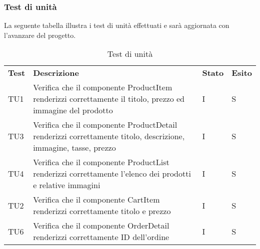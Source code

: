 \subsubsection{Test di unità}
La seguente tabella illustra i test di unità effettuati e sarà aggiornata con l'avanzare del progetto.
\begin{center}
    \centering
    \renewcommand{\arraystretch}{1.8}
    \label{tab:TestUnita}
    \begin{longtable}[!h]{p{45px} p{255px} p{35px} p{35px}}
        \caption{Test di unità}                                                                                                                                                                                                                            \\
        \rowcolor{logo!70}
        \textbf{Test} & \textbf{Descrizione}                                                                                                                                                                             & \textbf{Stato} & \textbf{Esito} \\
        TU1           & Verifica che il componente ProductItem renderizzi correttamente il titolo, prezzo ed immagine del prodotto                                                                                       & I              & S              \\
        TU3           & Verifica che il componente ProductDetail renderizzi correttamente titolo, descrizione, immagine, tasse, prezzo                                                                                   & I              & S              \\
        TU4           & Verifica che il componente ProductList renderizzi correttamente l'elenco dei prodotti e relative immagini                                                                                        & I              & S              \\
        TU2           & Verifica che il componente CartItem renderizzi correttamente titolo e prezzo                                                                                                                     & I              & S              \\
        TU6           & Verifica che il componente OrderDetail renderizzi correttamente ID dell'ordine                                                                                                                   & I              & S              \\

\end{longtable}
\end{center}
